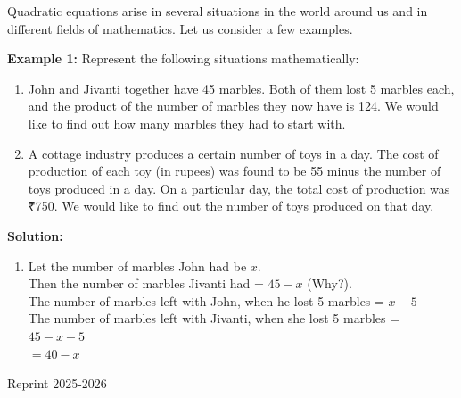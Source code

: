 \documentclass[12pt]{article}
\begin{document}
Quadratic equations arise in several situations in the world around us and in different fields of mathematics. Let us consider a few examples.

\textbf{\color{cyanblue}Example 1:} Represent the following situations mathematically:
\vspace{-1em}
\begin{enumerate}[label=(\roman*), leftmargin=0.7cm] 
\item John and Jivanti together have 45 marbles. Both of them lost 5 marbles each, and the product of the number of marbles they now have is 124. We would like to find out how many marbles they had to start with.
 
\item A cottage industry produces a certain number of toys in a day. The cost of production of each toy (in rupees) was found to be 55 minus the number of toys produced in a day. On a particular day, the total cost of production was ₹750. We would like to find out the number of toys produced on that day.
\end{enumerate}
\vspace{-1em}
\textbf{\color{cyanblue}Solution:}
\begin{enumerate}[label=(\roman*), leftmargin=0.8cm]
\vspace{-1em}
\item Let the number of marbles John had be $x$.\\
Then the number of marbles Jivanti had = $45 - x$ (Why?).\\
The number of marbles left with John, when he lost 5 marbles = $x - 5$\\
The number of marbles left with Jivanti, when she lost 5 marbles = $45 - x - 5$\\
\hspace*{11cm}$= 40 - x$
\end{enumerate}
\vspace*{4em}
\centering
Reprint 2025-2026
\newpage
\noindent
{}
\vspace{-3em}
\begin{flushleft}
\hspace{2em}{Therefore, their product = (x – 5) (40 – x)}\\
\hspace{12em}= 40x – x^2– 200 + 5x}\\
\end{flushleft}
\end{document}
